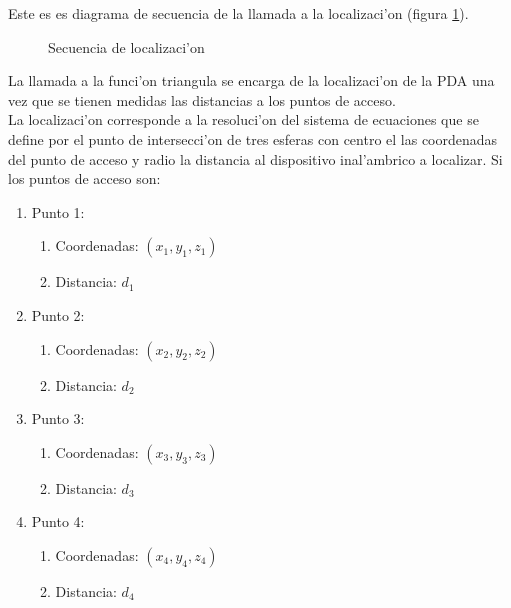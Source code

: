 Este es es diagrama de secuencia de la llamada a la localizaci'on (figura \ref{fig:localizador}).
\begin{figure}[h!]
	\begin{center}
     	\end{center}
    	\caption{Secuencia de localizaci'on}
	\label{fig:localizador}
\end{figure}

La llamada a la funci'on triangula se encarga de la localizaci'on de la PDA una vez que se tienen medidas las distancias a los puntos de acceso.\bigskip \\ La localizaci'on corresponde a la resoluci'on del sistema de ecuaciones que se define por el punto de intersecci'on de tres esferas con centro el las coordenadas del punto de acceso y radio la distancia al dispositivo inal'ambrico a localizar. Si los puntos de acceso son:

\begin{enumerate}
\item Punto 1: 
	\begin{enumerate}
	\item Coordenadas: $(x_1,y_1,z_1)$
	\item Distancia: $d_1$
	\end{enumerate}

\item Punto 2: 
	\begin{enumerate}
	\item Coordenadas: $(x_2,y_2,z_2)$
	\item Distancia: $d_2$
	\end{enumerate}

\item Punto 3: 
	\begin{enumerate}
	\item Coordenadas: $(x_3,y_3,z_3)$
	\item Distancia: $d_3$
	\end{enumerate}

\item Punto 4: 
	\begin{enumerate}
	\item Coordenadas: $(x_4,y_4,z_4)$
	\item Distancia: $d_4$
	\end{enumerate}
\end{enumerate}

